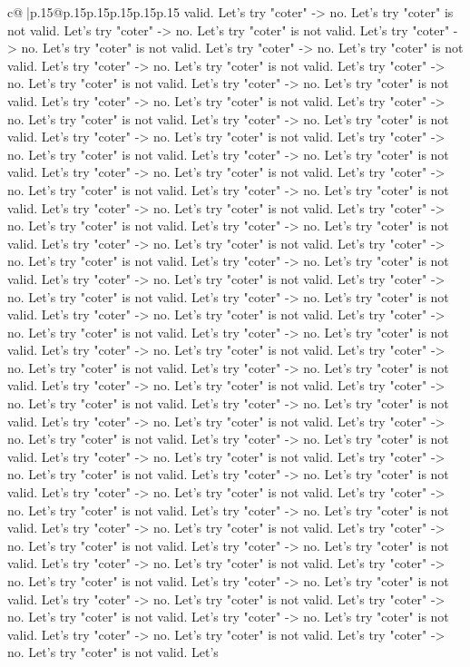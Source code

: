 \documentclass{article}
\begin{document}
{\begin{supertabular}{c@{$\;$}|p{.15\linewidth}@{}p{.15\linewidth}p{.15\linewidth}p{.15\linewidth}p{.15\linewidth}p{.15\linewidth}}
{{{valid. Let's try "coter" {-}> no. Let's try "coter" is not valid. Let's try "coter" {-}> no. Let's try "coter" is not valid. Let's try "coter" {-}> no. Let's try "coter" is not valid. Let's try "coter" {-}> no. Let's try "coter" is not valid. Let's try "coter" {-}> no. Let's try "coter" is not valid. Let's try "coter" {-}> no. Let's try "coter" is not valid. Let's try "coter" {-}> no. Let's try "coter" is not valid. Let's try "coter" {-}> no. Let's try "coter" is not valid. Let's try "coter" {-}> no. Let's try "coter" is not valid. Let's try "coter" {-}> no. Let's try "coter" is not valid. Let's try "coter" {-}> no. Let's try "coter" is not valid. Let's try "coter" {-}> no. Let's try "coter" is not valid. Let's try "coter" {-}> no. Let's try "coter" is not valid. Let's try "coter" {-}> no. Let's try "coter" is not valid. Let's try "coter" {-}> no. Let's try "coter" is not valid. Let's try "coter" {-}> no. Let's try "coter" is not valid. Let's try "coter" {-}> no. Let's try "coter" is not valid. Let's try "coter" {-}> no. Let's try "coter" is not valid. Let's try "coter" {-}> no. Let's try "coter" is not valid. Let's try "coter" {-}> no. Let's try "coter" is not valid. Let's try "coter" {-}> no. Let's try "coter" is not valid. Let's try "coter" {-}> no. Let's try "coter" is not valid. Let's try "coter" {-}> no. Let's try "coter" is not valid. Let's try "coter" {-}> no. Let's try "coter" is not valid. Let's try "coter" {-}> no. Let's try "coter" is not valid. Let's try "coter" {-}> no. Let's try "coter" is not valid. Let's try "coter" {-}> no. Let's try "coter" is not valid. Let's try "coter" {-}> no. Let's try "coter" is not valid. Let's try "coter" {-}> no. Let's try "coter" is not valid. Let's try "coter" {-}> no. Let's try "coter" is not valid. Let's try "coter" {-}> no. Let's try "coter" is not valid. Let's try "coter" {-}> no. Let's try "coter" is not valid. Let's try "coter" {-}> no. Let's try "coter" is not valid. Let's try "coter" {-}> no. Let's try "coter" is not valid. Let's try "coter" {-}> no. Let's try "coter" is not valid. Let's try "coter" {-}> no. Let's try "coter" is not valid. Let's try "coter" {-}> no. Let's try "coter" is not valid. Let's try "coter" {-}> no. Let's try "coter" is not valid. Let's try "coter" {-}> no. Let's try "coter" is not valid. Let's try "coter" {-}> no. Let's try "coter" is not valid. Let's try "coter" {-}> no. Let's try "coter" is not valid. Let's try "coter" {-}> no. Let's try "coter" is not valid. Let's try "coter" {-}> no. Let's try "coter" is not valid. Let's try "coter" {-}> no. Let's try "coter" is not valid. Let's try "coter" {-}> no. Let's try "coter" is not valid. Let's try "coter" {-}> no. Let's try "coter" is not valid. Let's try "coter" {-}> no. Let's try "coter" is not valid. Let's try "coter" {-}> no. Let's try "coter" is not valid. Let's try "coter" {-}> no. Let's try "coter" is not valid. Let's try "coter" {-}> no. Let's try "coter" is not valid. Let's try "coter" {-}> no. Let's try "coter" is not valid. Let's try "coter" {-}> no. Let's try "coter" is not valid. Let's try "coter" {-}> no. Let's try "coter" is not valid. Let's try "coter" {-}> no. Let's try "coter" is not valid. Let's }}}
\end{supertabular}}
\end{document}
